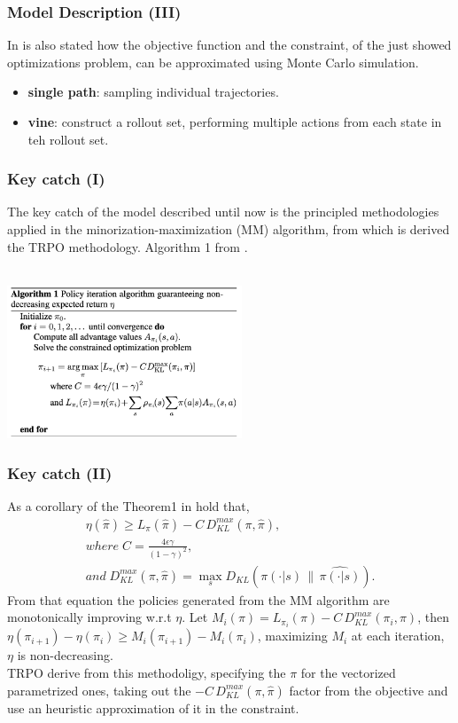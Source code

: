 \documentclass{beamer}
\begin{document}
\begin{frame}
\frametitle{Model Description (III)}
In \cite{schulman2015trust} is also stated how the objective function and the constraint, of the just showed optimizations problem, can be approximated using Monte Carlo simulation.
\begin{itemize}
    \item \textbf{single path}: sampling individual trajectories.
    \item \textbf{vine}: construct a rollout set, performing multiple actions from each state in teh rollout set.
\end{itemize}
\end{frame}

\begin{frame}
\frametitle{Key catch (I)}
The key catch of the model described until now is the principled methodologies applied in the minorization-maximization (MM) algorithm, from which is derived the TRPO methodology.
Algorithm 1 from \cite{schulman2015trust}.\\~\\
\begin{centering}
\includegraphics[width=7cm]{algo.png}\\
\end{centering}
\end{frame}

\begin{frame}
\frametitle{Key catch (II)}
As a corollary of the Theorem1 in \cite{schulman2015trust} hold that,
\begin{gather*}
\eta(\hat{\pi}) \geq L_{\pi}(\hat{\pi}) - C \, D_{KL}^{max}(\pi, \hat{\pi}),\\
where \; C = \frac{4\epsilon\gamma}{(1-\gamma)^2}, \\
and \; D_{KL}^{max}(\pi, \hat{\pi}) = \max_s D_{KL}(\pi(\cdot|s) \, \| \, \hat{\pi(\cdot|s)}).
\end{gather*}
From that equation the policies generated from the MM algorithm are monotonically improving w.r.t $\eta$.
Let $M_i(\pi) = L_{\pi_i}(\pi) - C \, D_{KL}^{max}(\pi_i, \pi)$, then $\eta(\pi_{i+1}) - \eta(\pi_i) \geq M_i(\pi_{i+1}) - M_i(\pi_{i})$, maximizing $M_i$ at each iteration, $\eta$ is non-decreasing.\\
TRPO derive from this methodoligy, specifying the $\pi$ for the vectorized parametrized ones, taking out the $-C \, D_{KL}^{max}(\pi, \hat{\pi})$ factor from the objective and use an heuristic approximation of it in the constraint.
\end{frame}
\end{document}
